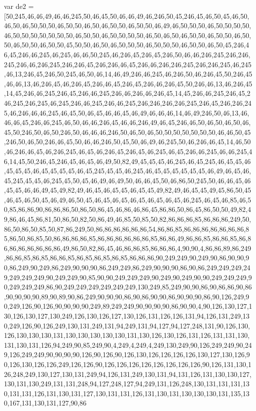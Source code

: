 var de2 = [50,245,46,46,49,46,46,245,50,46,45,50,46,46,49,46,246,50,45,246,45,46,50,45,46,50,46,50,46,50,50,50,46,50,50,46,50,46,50,50,46,50,50,46,49,46,50,50,50,46,50,50,50,50,46,50,50,50,50,50,50,50,46,50,50,46,50,50,50,50,46,50,46,50,46,50,50,46,50,50,46,50,50,46,50,50,46,50,50,45,50,50,46,50,46,50,50,50,46,50,50,50,46,50,50,46,50,45,246,46,45,246,46,245,46,245,46,46,50,245,46,246,45,246,45,246,50,46,46,246,245,246,246,245,246,46,246,245,246,246,45,246,246,46,45,246,46,246,246,245,246,246,245,46,245,46,13,246,45,246,50,245,46,50,46,14,46,49,246,46,245,46,246,50,46,246,45,50,246,45,46,46,13,46,246,45,46,246,45,246,46,45,246,45,246,46,246,45,50,246,46,13,46,246,45,14,45,246,46,245,246,45,246,46,245,246,46,246,46,246,45,14,45,246,46,245,246,45,246,245,246,245,46,245,246,46,245,246,46,245,246,246,246,246,245,246,45,246,246,245,46,246,46,46,245,46,45,50,46,45,46,46,45,46,49,46,46,46,14,46,49,246,50,46,13,46,46,46,45,246,46,245,46,50,46,46,246,45,46,46,246,49,46,45,246,46,50,46,50,46,50,46,45,50,246,50,46,50,246,50,46,46,46,246,50,46,50,46,50,50,50,50,50,50,50,46,46,50,45,246,50,46,50,246,46,45,50,46,46,246,50,45,50,46,49,46,245,50,46,246,46,45,14,46,50,46,246,46,45,46,246,245,46,45,46,246,45,246,45,46,245,46,45,246,46,245,46,46,245,46,14,45,50,246,45,246,45,46,45,46,49,50,82,49,45,45,45,46,245,46,45,245,46,45,45,46,45,45,45,46,45,45,45,45,46,45,245,45,45,46,245,46,45,45,45,45,45,45,46,49,46,45,46,45,245,45,45,46,245,45,50,45,46,49,46,49,50,46,46,45,50,46,86,50,245,50,46,46,45,46,45,45,46,46,49,45,49,82,49,46,45,46,45,45,46,45,45,49,82,49,46,45,45,49,45,86,50,45,46,45,46,50,45,46,49,46,50,45,46,45,46,45,46,45,46,45,46,45,46,245,46,45,46,85,46,50,85,86,86,90,86,86,86,50,86,50,86,45,46,86,46,86,45,86,86,50,86,45,86,50,50,49,82,49,86,46,45,86,81,50,86,50,82,50,86,49,46,85,50,85,50,82,86,86,86,85,86,86,86,249,50,86,50,86,50,85,50,87,86,249,50,86,86,86,86,86,86,54,86,86,85,86,86,86,86,86,86,86,85,86,50,86,85,50,86,86,86,86,85,86,86,86,86,86,86,85,86,86,49,86,86,85,86,86,85,86,86,86,86,86,86,86,86,49,86,50,82,86,45,46,86,86,85,86,86,86,4,90,90,4,86,86,89,86,249,86,86,85,86,85,86,86,85,86,85,86,85,86,85,86,86,86,90,249,249,90,249,90,86,90,90,90,86,249,90,249,86,249,90,90,90,86,249,249,86,249,90,90,90,86,90,86,249,249,249,249,249,249,249,90,249,249,90,85,90,90,249,249,249,90,249,90,249,90,90,249,249,249,90,249,249,249,86,90,249,249,249,249,249,249,130,249,85,249,90,90,86,90,86,86,90,86,90,90,90,90,89,90,89,90,86,249,90,90,90,86,90,86,90,90,86,90,90,90,86,90,126,249,90,249,126,90,126,90,90,90,90,249,89,249,249,90,90,90,90,86,90,90,4,90,126,130,127,130,126,130,127,130,249,126,130,126,127,130,126,131,126,126,131,94,126,131,249,130,249,126,90,126,249,130,131,249,131,94,249,131,94,127,94,127,248,131,90,126,130,126,130,130,130,131,130,130,130,130,130,131,130,126,130,126,131,126,131,131,130,131,130,131,126,94,249,90,85,249,90,4,249,4,249,4,249,130,249,90,126,249,249,90,249,126,249,249,90,90,90,90,126,90,126,90,126,130,126,126,126,126,130,127,130,126,90,126,130,126,126,249,126,126,90,126,126,126,126,126,126,126,126,90,126,131,130,126,248,249,130,127,130,131,249,94,126,131,249,130,131,94,131,126,131,130,130,127,130,131,130,249,131,131,248,94,127,248,127,94,249,131,126,248,130,131,131,131,130,131,131,126,131,130,131,127,130,131,131,126,131,130,131,130,130,130,131,135,130,167,131,130,131,127,90,86